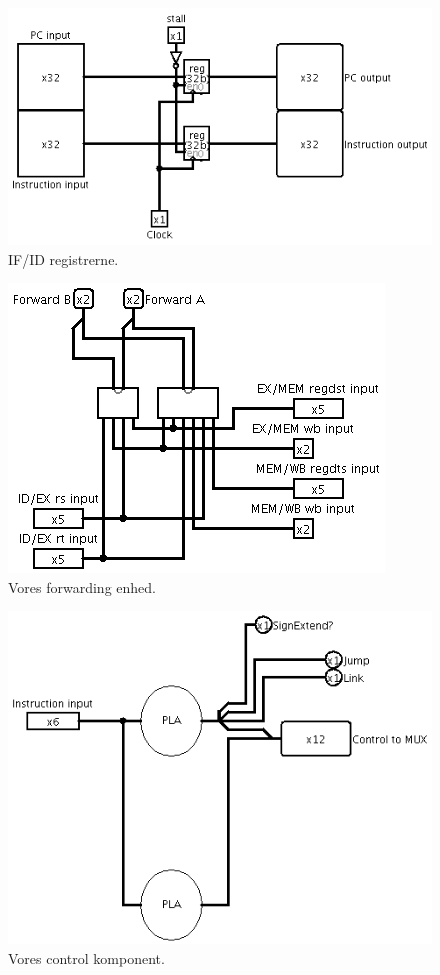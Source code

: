 \documentclass [10pt,a4paper]{article}
\begin{document}
\begin{figure}[h!]
  \centering  
    \includegraphics[scale=0.7]{ifid.png}
  \caption{IF/ID registrerne.}
\end{figure}

\begin{figure}[h!]
  \centering  
    \includegraphics[scale=0.7]{forwarding.png}
  \caption{Vores forwarding enhed.}
\end{figure}

\begin{figure}[h!]
  \centering  
    \includegraphics[scale=0.7]{control.png}
  \caption{Vores control komponent.}
\end{figure}
\end{document}
